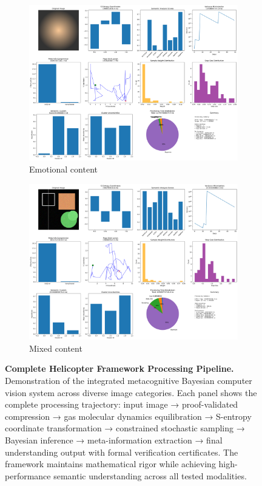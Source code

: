 \begin{figure}[htbp]
\begin{subfigure}{0.48\textwidth}
\includegraphics[width=\textwidth]{helicopter/demos/helicopter_demo_emotional_complete.png}
\caption{Emotional content}
\end{subfigure}
\hfill
\begin{subfigure}{0.48\textwidth}
\includegraphics[width=\textwidth]{helicopter/demos/helicopter_demo_mixed_complete.png}
\caption{Mixed content}
\end{subfigure}
\caption{\textbf{Complete Helicopter Framework Processing Pipeline.} Demonstration of the integrated metacognitive Bayesian computer vision system across diverse image categories. Each panel shows the complete processing trajectory: input image → proof-validated compression → gas molecular dynamics equilibration → S-entropy coordinate transformation → constrained stochastic sampling → Bayesian inference → meta-information extraction → final understanding output with formal verification certificates. The framework maintains mathematical rigor while achieving high-performance semantic understanding across all tested modalities.}
\label{fig:helicopter-complete-system}
\end{figure}

